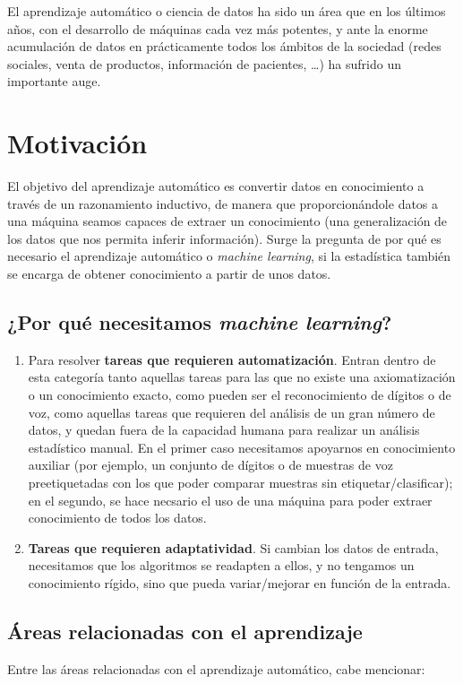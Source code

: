 El aprendizaje automático o ciencia de datos ha sido un área que en los últimos años, con el desarrollo de máquinas cada vez
más potentes, y ante la enorme acumulación de datos en prácticamente todos los ámbitos de la sociedad (redes sociales, venta de
productos, información de pacientes, \ldots) ha sufrido un importante auge.

\section{Motivación}
El objetivo del aprendizaje automático es convertir datos en conocimiento a través de un razonamiento inductivo, de manera que
proporcionándole datos a una máquina seamos capaces de extraer un conocimiento (una generalización de los datos que nos permita
inferir información). Surge la pregunta de por qué es necesario el aprendizaje automático o \textit{machine learning}, si la
estadística también se encarga de obtener conocimiento a partir de unos datos.

\subsection{¿Por qué necesitamos \textit{machine learning}?}
\begin{enumerate}[i]
\item Para resolver \textbf{tareas que requieren automatización}. Entran dentro de esta categoría tanto aquellas tareas para
las que no existe una axiomatización o un conocimiento exacto, como pueden ser el reconocimiento de dígitos o de voz, como 
aquellas tareas que requieren del análisis de un gran número de datos, y quedan fuera de la capacidad humana para realizar
un análisis estadístico manual. En el primer caso necesitamos apoyarnos en conocimiento auxiliar (por ejemplo, 
un conjunto de dígitos o de muestras de voz preetiquetadas con los que poder comparar muestras sin etiquetar/clasificar); 
en el segundo, se hace necsario el uso de una máquina para poder extraer conocimiento de todos los datos.

\item \textbf{Tareas que requieren adaptatividad}. Si cambian los datos de entrada, necesitamos que los algoritmos se readapten
a ellos, y no tengamos un conocimiento rígido, sino que pueda variar/mejorar en función de la entrada.
\end{enumerate}

\subsection{Áreas relacionadas con el aprendizaje}
Entre las áreas relacionadas con el aprendizaje automático, cabe mencionar:

